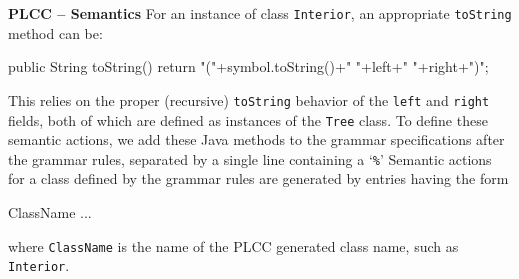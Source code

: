 \begin{minipage}[t]{\sw}
\slidenumber
\LARGE
{\bf PLCC -- Semantics}\exx
For an instance of class \verb'Interior',
an appropriate \verb'toString' method can be:
{\Large
\begin{qv}
public String toString() {
    return "("+symbol.toString()+" "+left+" "+right+")";
}
\end{qv}
}
This relies on the proper (recursive) \verb'toString' behavior
of the \verb'left' and \verb'right' fields,
both of which are defined as instances of the \verb'Tree' class.\exx
To define these semantic actions, we add these Java methods
to the grammar specifications after the grammar rules,
separated by a single line containing a `\verb'%''\exx
Semantic actions for a class defined by the grammar rules
are generated by entries having the form
{\Large
\begin{qv}
ClassName
...
\end{qv}
}
where \verb'ClassName' is the name of the PLCC generated class name,
such as \verb'Interior'.
\end{minipage}
\clearpage

